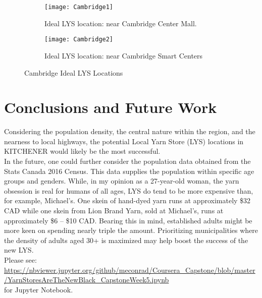 \documentclass[10pt,a4paper]{report}
\begin{document}
\begin{figure}[h!]
	\centering
	\begin{subfigure}{.5\textwidth}
		\centering
		\texttt{[image: Cambridge1]}
		\caption{Ideal LYS location: near Cambridge Center Mall.}
		\label{fig:cambridge1}
	\end{subfigure}%
	\begin{subfigure}{.5\textwidth}
		\centering
		\texttt{[image: Cambridge2]}
		\caption{Ideal LYS location: near Cambridge Smart Centers}
		\label{fig:cambridge2}
	\end{subfigure}
	\caption{Cambridge Ideal LYS Locations}
	\label{fig:cambridgeLocations}
\end{figure}

\chapter{Conclusions and Future Work}
\noindent Considering the population density, the central nature within the region, and the nearness to local highways, the potential Local Yarn Store (LYS) locations in KITCHENER would likely be the most successful.\\

\noindent In the future, one could further consider the population data obtained from the Stats Canada 2016 Census. This data supplies the population within specific age groups and genders. While, in my opinion as a 27-year-old woman, the yarn obsession is real for humans of all ages, LYS do tend to be more expensive than, for example, Michael's. One skein of hand-dyed yarn runs at approximately \$32 CAD while one skein from Lion Brand Yarn, sold at Michael's, runs at approximately \$6 -- \$10 CAD. Bearing this in mind, established adults might be more keen on spending nearly triple the amount. Prioritizing municipalities where the density of adults aged 30+ is maximized may help boost the success of the new LYS. \\

\noindent Please see:\\ \url{https://nbviewer.jupyter.org/github/meconrad/Coursera_Capstone/blob/master/YarnStoresAreTheNewBlack_CapstoneWeek5.ipynb}\\ for Jupyter Notebook.
\end{document}
